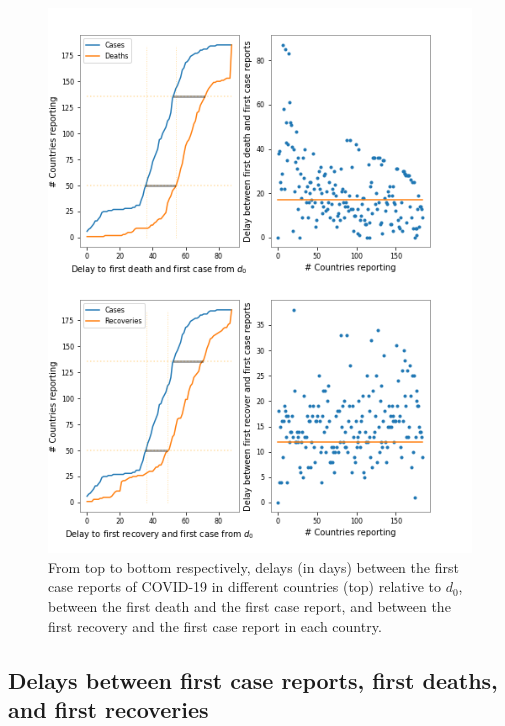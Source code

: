 \documentclass[8pt]{article}
\begin{document}
\begin{figure}[h]
\begin{minipage}{0.5\textwidth}
    \includegraphics[width=\textwidth]{figures/tsam_Covid19_JHU_delays_caseDeaths.png}
    \end{minipage}
    \caption{From top to bottom respectively, delays (in days) between the first case reports of COVID-19 in different countries (top) relative to $d_0$, between the first death and the first case report, and  between the first recovery and the first case report 
    in each country.}
    \label{fig:caseDelays}
\end{figure}

\subsection{Delays between first case reports, first deaths, and first recoveries}
\end{document}
